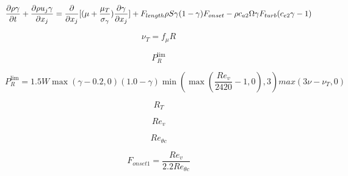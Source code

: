 {\newpage\clearpage
{}%
\begin{displaymath}
\frac{\partial \rho \gamma }{\partial t}+\frac{\partial \rho 
        u_{j}\gamma }{\partial x_{j}}=\frac{\partial }{\partial x_{j}}\lbrack 
        (\mu +\frac{\mu _{T}}{\sigma _{\gamma }})\frac{\partial \gamma 
        }{\partial x_{j}}\rbrack +F_{length}\rho S\gamma (1-\gamma 
        )F_{onset} \\-\rho c_{a2}\Omega \gamma F_{turb}(c_{e2}\gamma -1)
\end{displaymath}%
\lthtmldisplayZ
\lthtmlcheckvsize\clearpage}

{\newpage\clearpage
{}%
\begin{displaymath}
\nu_{T} = f_{\mu}R
\end{displaymath}%
\lthtmldisplayZ
\lthtmlcheckvsize\clearpage}

{\newpage\clearpage
{}%
\begin{displaymath}
P_{R}^{\lim}
\end{displaymath}%
\lthtmldisplayZ
\lthtmlcheckvsize\clearpage}

{\newpage\clearpage
{}%
\begin{displaymath}
P_{R}^{\lim }=1.5W\max (\gamma -0.2, 0)(1.0-\gamma )\min (\max 
(\frac{Re_{v}}{2420}-1, 0), 3)max(3\nu- \nu_{T}, 0)
\end{displaymath}%
\lthtmldisplayZ
\lthtmlcheckvsize\clearpage}

{\newpage\clearpage
{}%
\begin{displaymath}
R_{T}
\end{displaymath}%
\lthtmldisplayZ
\lthtmlcheckvsize\clearpage}

{\newpage\clearpage
{}%
\begin{displaymath}
Re_{v}
\end{displaymath}%
\lthtmldisplayZ
\lthtmlcheckvsize\clearpage}

{\newpage\clearpage
{}%
\begin{displaymath}
Re_{\theta c}
\end{displaymath}%
\lthtmldisplayZ
\lthtmlcheckvsize\clearpage}

{\newpage\clearpage
{}%
\begin{displaymath}
F_{onset1}=\frac{Re_{v}}{2.2Re_{\theta c}}
\end{displaymath}%
\lthtmldisplayZ
\lthtmlcheckvsize\clearpage}

